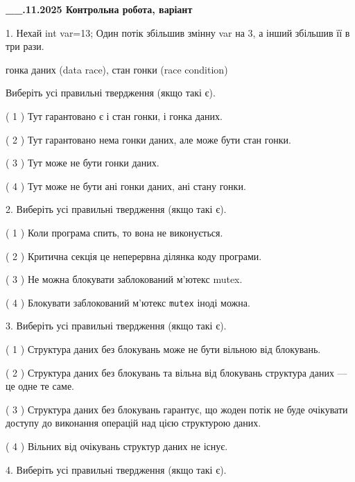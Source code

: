 \documentclass[12pt, ukrainian]{article}
\def\code#1{\Verb!#1!}
\begin{document}
\newpage
\begin {large}

\textbf{\_\_.11.2025 Контрольна робота, варіант  }\par


{
1. Нехай int var=13; Один потік збільшив змінну var на 3, а інший збільшив її в три рази.

гонка даних (data race), стан гонки (race condition)

Виберіть усі правильні твердження (якщо такі є).\par
\vspace{2mm}
( 1 ) Тут гарантовано є і стан гонки, і гонка даних.%

( 2 ) Тут гарантовано нема гонки даних, але може бути стан гонки.%

( 3 ) Тут може не бути гонки даних.%

( 4 ) Тут може не бути ані гонки даних, ані стану гонки.%


2. Виберіть усі правильні твердження (якщо такі є).\par
\vspace{2mm}

( 1 ) Коли програма спить, то вона не виконується.%

( 2 ) Критична секція це неперервна ділянка коду програми.%

( 3 ) Не можна блокувати заблокований м’ютекс mutex.%

( 4 ) Блокувати заблокований м’ютекс  \code{mutex} іноді можна.%


3. Виберіть усі правильні твердження (якщо такі є).\par
\vspace{2mm}

( 1 ) Структура даних без блокувань може не бути вільною від блокувань.%

( 2 ) Структура даних без блокувань та вільна від блокувань структура даних --- це одне те саме.%

( 3 ) Структура даних без блокувань гарантує, що жоден потік не буде очікувати доступу до виконання операцій над цією структурою даних.%

( 4 ) Вільних від очікувань структур даних не існує.%


4. Виберіть усі правильні твердження (якщо такі є).\par
\vspace{2mm}

}
\end{large}
\end{document}
